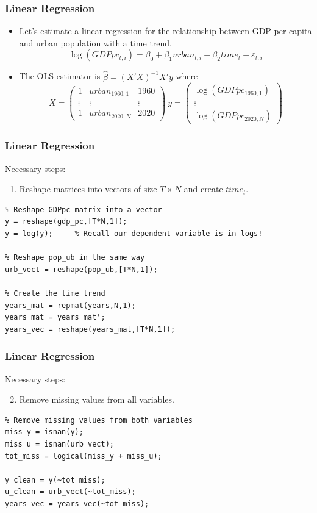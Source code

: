 \documentclass[11pt,xcolor={svgnames},aspectratio=169,usepdftitle=false]{beamer}
\begin{document}
\begin{frame}[fragile]
  \frametitle{Linear Regression}
\begin{itemize}
  \item Let's estimate a linear regression for the relationship between GDP per capita and urban population with a time trend.
  \[
  \log(GDPpc_{t,i}) = \beta_0 + \beta_1 urban_{t,i} + \beta_2 time_t + \varepsilon_{t,i}
  \]
  \item The OLS estimator is $\hat{\beta} = (X'X)^{-1}X'y$ where
  \[
  X = \begin{pmatrix}
    1 & urban_{1960,1} & 1960 \\
    \vdots & \vdots & \vdots \\
    1 & urban_{2020,N} & 2020 
  \end{pmatrix}  \ 
  y = \begin{pmatrix}
    \log(GDPpc_{1960,1}) \\
    \vdots \\
    \log(GDPpc_{2020,N})
  \end{pmatrix}
  \]
\end{itemize}
\end{frame}

\begin{frame}[fragile]
  \frametitle{Linear Regression}
Necessary steps:
\begin{enumerate}
  \item Reshape matrices into vectors of size $T\times N$ and create $time_t$.
\end{enumerate}
\begin{lstlisting}
% Reshape GDPpc matrix into a vector
y = reshape(gdp_pc,[T*N,1]);
y = log(y);     % Recall our dependent variable is in logs!

% Reshape pop_ub in the same way
urb_vect = reshape(pop_ub,[T*N,1]);

% Create the time trend
years_mat = repmat(years,N,1);
years_mat = years_mat';
years_vec = reshape(years_mat,[T*N,1]);
\end{lstlisting}
\end{frame}

\begin{frame}[fragile]
  \frametitle{Linear Regression}
Necessary steps:
\begin{enumerate}
  \setcounter{enumi}{1}
  \item Remove missing values from all variables.
\end{enumerate}
\begin{lstlisting}
% Remove missing values from both variables
miss_y = isnan(y);
miss_u = isnan(urb_vect);
tot_miss = logical(miss_y + miss_u);

y_clean = y(~tot_miss);
u_clean = urb_vect(~tot_miss);
years_vec = years_vec(~tot_miss);
\end{lstlisting}
\end{frame}
\end{document}
